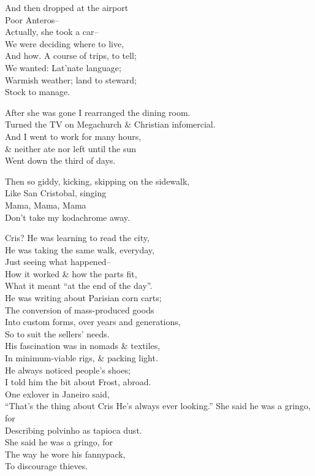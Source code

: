 And then dropped at the airport \\
Poor Anteros-- \\
Actually, she took a car-- \\
We were deciding where to live, \\
And how. A course of trips, to tell; \\
We wanted: Lat'nate language; \\
Warmish weather; land to steward; \\
Stock to manage.

After she was gone I rearranged the dining room. \\
Turned the TV on Megachurch \& Christian infomercial. \\
And I went to work for many hours, \\
\& neither ate nor left until the sun \\
Went down  the third of days.

Then so giddy, kicking, skipping on the sidewalk, \\
Like San Cristobal, singing \\
\qquad Mama, Mama, Mama \\
\qquad Don't take my kodachrome away.

Cris? He was learning to read the city, \\
He was taking the same walk, everyday, \\
Just seeing what happened-- \\
How it worked \& how the parts fit, \\
What it meant ``at the end of the day''. \\
He was writing about Parisian corn carts; \\
The conversion of mass-produced goods \\
Into custom forms, over years and generations, \\
So to suit the sellers' needs. \\
His fascination was in nomads \& textiles, \\
In minimum-viable rigs, \& packing light. \\
He always noticed people's shoes; \\
I told him the bit about Frost, abroad. \\
One exlover in Janeiro said, \\
\qquad ``That's the thing about Cris
\qquad He's always ever looking.''
She said he was a gringo, for \\
Describing polvinho as tapioca dust. \\
She said he was a gringo, for \\
The way he wore his fannypack, \\
To discourage thieves.